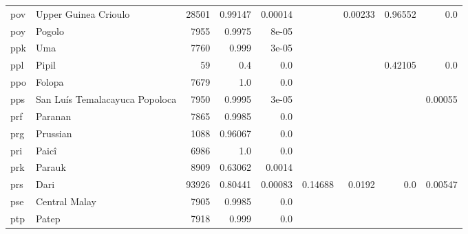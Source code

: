 \documentclass[11pt]{article}
\begin{document}
\begin{table*}[h]
{\begin{tabular}{llrrrrrrr}
pov         & Upper Guinea Crioulo         & 28501         & 0.99147         & 0.00014         &          & 0.00233         & 0.96552         & 0.0         \\

poy         & Pogolo         & 7955         & 0.9975         & 8e-05         &          &          &          &          \\

ppk         & Uma         & 7760         & 0.999         & 3e-05         &          &          &          &          \\

ppl         & Pipil         & 59         & 0.4         & 0.0         &          &          & 0.42105         & 0.0         \\

ppo         & Folopa         & 7679         & 1.0         & 0.0         &          &          &          &          \\

pps         & San Luís Temalacayuca Popoloca         & 7950         & 0.9995         & 3e-05         &          &          &          & 0.00055         \\

prf         & Paranan         & 7865         & 0.9985         & 0.0         &          &          &          &          \\

prg         & Prussian         & 1088         & 0.96067         & 0.0         &          &          &          &          \\

pri         & Paicî         & 6986         & 1.0         & 0.0         &          &          &          &          \\

prk         & Parauk         & 8909         & 0.63062         & 0.0014         &          &          &          &          \\

prs         & Dari         & 93926         & 0.80441         & 0.00083         & 0.14688         & 0.0192         & 0.0         & 0.00547         \\

pse         & Central Malay         & 7905         & 0.9985         & 0.0         &          &          &          &          \\

ptp         & Patep         & 7918         & 0.999         & 0.0         &          &          &          &          \\


\end{tabular}}
\end{table*}
\end{document}

